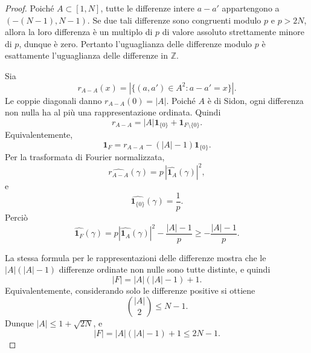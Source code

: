 \documentclass[11pt]{article}
\numberwithin{equation}{section}
\newcommand{\Z}{\mathbb Z}
\newcommand{\1}{\mathbf 1}
\begin{document}
\begin{proof}
Poiché \(A\subset[1,N]\), tutte le differenze intere \(a-a'\) appartengono a \((-(N-1),N-1)\). Se due tali differenze sono congruenti modulo \(p\) e \(p>2N\), allora la loro differenza è un multiplo di \(p\) di valore assoluto strettamente minore di \(p\), dunque è zero. Pertanto l'uguaglianza delle differenze modulo \(p\) è esattamente l'uguaglianza delle differenze in \(\Z\).

Sia
\[
        r_{A-A}(x)=|\{(a,a')\in A^2:a-a'=x\}|.
\]
Le coppie diagonali danno \(r_{A-A}(0)=|A|\). Poiché \(A\) è di Sidon, ogni differenza non nulla ha al più una rappresentazione ordinata. Quindi
\[
        r_{A-A}=|A|\1_{\{0\}}+\1_{F\setminus\{0\}}.
\]
Equivalentemente,
\[
        \1_F=r_{A-A}-(|A|-1)\1_{\{0\}}.
\]
Per la trasformata di Fourier normalizzata,
\[
        \widehat{r_{A-A}}(\gamma)
        =
        p\,|\widehat{\1_A}(\gamma)|^2,
\]
e
\[
        \widehat{\1_{\{0\}}}(\gamma)=\frac1p.
\]
Perciò
\[
        \widehat{\1_F}(\gamma)
        =
        p|\widehat{\1_A}(\gamma)|^2-\frac{|A|-1}{p}
        \ge
        -\frac{|A|-1}{p}.
\]

La stessa formula per le rappresentazioni delle differenze mostra che le \(|A|(|A|-1)\) differenze ordinate non nulle sono tutte distinte, e quindi
\[
        |F|=|A|(|A|-1)+1.
\]
Equivalentemente, considerando solo le differenze positive si ottiene
\[
        \binom{|A|}{2}\le N-1.
\]
Dunque \(|A|\le 1+\sqrt{2N}\), e
\[
        |F|=|A|(|A|-1)+1\le 2N-1.
\]
\end{proof}
\end{document}
